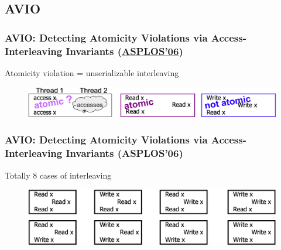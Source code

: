 \subsection{AVIO} %
\begin{frame}[fragile]
    \frametitle{AVIO: \small{Detecting Atomicity Violations via Access-Interleaving Invariants (\href{https://sites.cs.ucsb.edu/~arch/spr07-seminar/papers/avio-asplos06.pdf}{ASPLOS’06})}}

Atomicity violation = unserializable interleaving

    \begin{figure}
    \includegraphics[width=1.0\linewidth]{figs/serialization.png}
    \end{figure}
\end{frame}
% 
% 
% 
% 
% 
\begin{frame}[fragile]
    \frametitle{AVIO: \small{Detecting Atomicity Violations via Access-Interleaving Invariants (ASPLOS’06)}}

Totally 8 cases of interleaving

    \begin{figure}
    \includegraphics[width=1.0\linewidth]{figs/interleaving-cases.png}
    \end{figure}
\end{frame}
